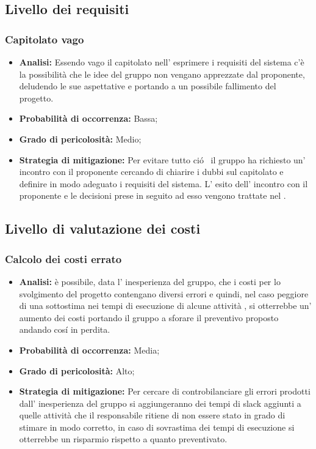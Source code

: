 \subsection{Livello dei requisiti}
\subsubsection{Capitolato vago}
	\begin{itemize}
	\item \textbf{Analisi: }Essendo vago il capitolato nell' esprimere i requisiti del sistema c'è la possibilità che le idee del gruppo non vengano apprezzate dal proponente, deludendo le sue aspettative e portando a un possibile fallimento del progetto.
	\item \textbf{Probabilità di occorrenza:} Bassa;
	\item \textbf{Grado di pericolosità:} Medio;
	\item \textbf{Strategia di mitigazione: }Per evitare tutto ci\'o~ il gruppo \gruppo ha richiesto un' incontro con il proponente cercando di chiarire i dubbi sul capitolato e definire in modo adeguato i requisiti del sistema. L' esito dell' incontro con il proponente e le decisioni prese in seguito ad esso vengono trattate nel \VerbaleB.
	\end{itemize}
\subsection{Livello di valutazione dei costi}
\subsubsection{Calcolo dei costi errato}
	\begin{itemize}
	\item \textbf{Analisi: }è possibile, data l' inesperienza del gruppo, che i costi per lo svolgimento del progetto contengano diversi errori e quindi, nel caso peggiore di una sottostima nei tempi di esecuzione di alcune attività , si otterrebbe un' aumento dei costi portando il gruppo a sforare il preventivo proposto andando cos\'i in perdita.
	\item \textbf{Probabilità di occorrenza:} Media;
	\item \textbf{Grado di pericolosità:} Alto;
	\item \textbf{Strategia di mitigazione: } Per cercare di controbilanciare gli errori prodotti dall' inesperienza del gruppo si aggiungeranno dei tempi di slack aggiunti a quelle attività che il responsabile ritiene di non essere stato in grado di stimare in modo corretto, in caso di sovrastima dei tempi di esecuzione si otterrebbe un risparmio rispetto a quanto preventivato.
	\end{itemize}